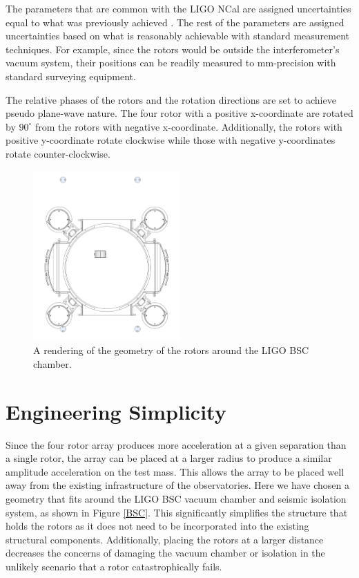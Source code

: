 \documentclass[superscriptaddress, twocolumn, prd]{revtex4-1}
\begin{document}
The parameters that are common with the LIGO NCal are assigned uncertainties equal to what was previously achieved \cite{ncal}. The rest of the parameters are assigned uncertainties based on what is reasonably achievable with standard measurement techniques. For example, since the rotors would be outside the interferometer's vacuum system, their positions can be readily measured to  mm-precision with standard surveying equipment.

The relative phases of the rotors and the rotation directions are set to achieve pseudo plane-wave nature. The four rotor with a positive x-coordinate are rotated by $90^\circ$ from the rotors with negative x-coordinate. Additionally, the rotors with positive y-coordinate rotate clockwise while those with negative y-coordinates rotate counter-clockwise. 

\begin{figure}[!h]
\centering \includegraphics[width=0.5\textwidth]{Super4BSCTopDown.pdf}
\caption{A rendering of the geometry of the rotors around the LIGO BSC chamber.}
\label{bsc} 
\end{figure}

\section{Engineering Simplicity}

Since the four rotor array produces more acceleration at a given separation than a single rotor, the array can be placed at a larger radius to produce a similar amplitude acceleration on the test mass. This allows the array to be placed well away from the existing infrastructure of the observatories. Here we have chosen a geometry that fits around the LIGO BSC vacuum chamber and seismic isolation system, as shown in Figure \ref{BSC}. This significantly simplifies the structure that holds the rotors as it does not need to be incorporated into the existing structural components. Additionally, placing the rotors at a larger distance decreases the concerns of damaging the vacuum chamber or isolation in the unlikely scenario that a rotor catastrophically fails.
\end{document}
